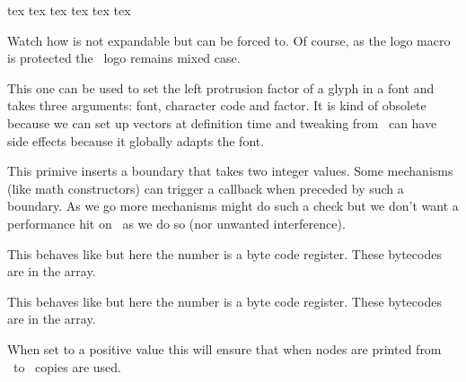 \startbuffer
\edef           \foo       {\lowercase{tex TeX \TEX}} \meaningless\foo
\lowercase{\edef\foo                  {tex TeX \TEX}} \meaningless\foo
\edef           \foo{\expand\lowercase{tex TeX \TEX}} \meaningless\foo
\stopbuffer

\typebuffer

Watch how  is not expandable but can be forced to. Of course, as
the logo macro is protected the \TEX\ logo remains mixed case.

\startlines
\getbuffer
\stoplines

\stopoldprimitive

\startnewprimitive[title={\prm {lpcode}}]

This one can be used to set the left protrusion factor of a glyph in a font and
takes three arguments: font, character code and factor. It is kind of obsolete
because we can set up vectors at definition time and tweaking from \TEX\ can have
side effects because it globally adapts the font.

\stopnewprimitive

\startnewprimitive[title={\prm {luaboundary}}]

This primive inserts a boundary that takes two integer values. Some mechanisms
(like math constructors) can trigger a callback when preceded by such a boundary.
As we go more mechanisms might do such a check but we don't want a performance
hit on \CONTEXT\ as we do so (nor unwanted interference).

\stopnewprimitive

\startnewprimitive[title={\prm {luabytecode}}]

This behaves like  but here the number is a byte code register.
These bytecodes are in the  array.

\stopnewprimitive

\startnewprimitive[title={\prm {luabytecodecall}}]

This behaves like  but here the number is a byte code
register. These bytecodes are in the  array.

\stopnewprimitive

\startnewprimitive[title={\prm {luacopyinputnodes}}]

When set to a positive value this will ensure that when nodes are printed from
\LUA\ to \TEX\ copies are used.

\stopnewprimitive

\startnewprimitive[title={\prm {luadef}}]

